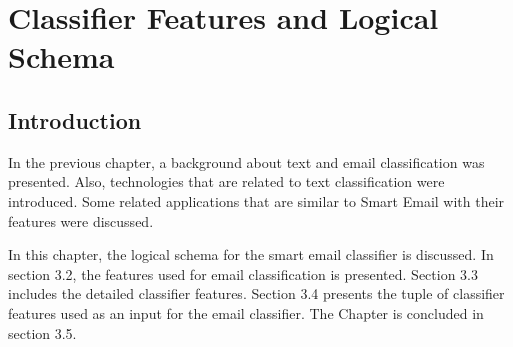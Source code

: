 
\chapter{Classifier Features and Logical Schema} %

\label{Chapter3} %



\section{Introduction}
In the previous chapter, a background about text and email classification was presented. Also, technologies that are related to text classification were introduced. Some related applications that are similar to Smart Email with their features were discussed.

In this chapter, the logical schema for the smart email classifier is discussed. In section 3.2, the features used for email classification is presented. Section 3.3 includes the detailed classifier features. Section 3.4 presents the tuple of classifier features used as an input for the email classifier.
The Chapter is concluded in section 3.5.
\newpage
